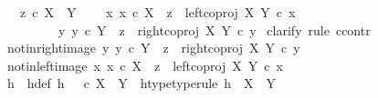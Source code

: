 \begin{isabellebody}
\ \ \ {\isachardoublequoteopen}z\ {\isasymin}\isactrlsub c\ X\ {\isasymCoprod}\ Y{\isachardoublequoteclose}\isanewline
\ \ \ {\isachardoublequoteopen}{\isacharparenleft}{\kern0pt}{\isasymexists}\ x{\isachardot}{\kern0pt}\ {\isacharparenleft}{\kern0pt}x\ {\isasymin}\isactrlsub c\ X\ {\isasymand}\ z\ {\isacharequal}{\kern0pt}\ {\isacharparenleft}{\kern0pt}left{\isacharunderscore}{\kern0pt}coproj\ X\ Y{\isacharparenright}{\kern0pt}\ {\isasymcirc}\isactrlsub c\ x{\isacharparenright}{\kern0pt}{\isacharparenright}{\kern0pt}\isanewline
\ \ \ \ \ \ {\isasymor}\ \ {\isacharparenleft}{\kern0pt}{\isasymexists}\ y{\isachardot}{\kern0pt}\ {\isacharparenleft}{\kern0pt}y\ {\isasymin}\isactrlsub c\ Y\ {\isasymand}\ z\ {\isacharequal}{\kern0pt}\ {\isacharparenleft}{\kern0pt}right{\isacharunderscore}{\kern0pt}coproj\ X\ Y{\isacharparenright}{\kern0pt}\ {\isasymcirc}\isactrlsub c\ y{\isacharparenright}{\kern0pt}{\isacharparenright}{\kern0pt}{\isachardoublequoteclose}\isanewline
%
\isadelimproof
%
\endisadelimproof
%
\isatagproof
{}\isamarkupfalse%
\ {\isacharparenleft}{\kern0pt}clarify{\isacharcomma}{\kern0pt}\ rule\ ccontr{\isacharparenright}{\kern0pt}\isanewline
\ \ \isamarkupfalse%
\ not{\isacharunderscore}{\kern0pt}in{\isacharunderscore}{\kern0pt}right{\isacharunderscore}{\kern0pt}image{\isacharcolon}{\kern0pt}\ {\isachardoublequoteopen}{\isasymnexists}y{\isachardot}{\kern0pt}\ y\ {\isasymin}\isactrlsub c\ Y\ {\isasymand}\ z\ {\isacharequal}{\kern0pt}\ right{\isacharunderscore}{\kern0pt}coproj\ X\ Y\ {\isasymcirc}\isactrlsub c\ y{\isachardoublequoteclose}\isanewline
\ \ \isamarkupfalse%
\ not{\isacharunderscore}{\kern0pt}in{\isacharunderscore}{\kern0pt}left{\isacharunderscore}{\kern0pt}image{\isacharcolon}{\kern0pt}\ {\isachardoublequoteopen}{\isasymnexists}x{\isachardot}{\kern0pt}\ x\ {\isasymin}\isactrlsub c\ X\ {\isasymand}\ z\ {\isacharequal}{\kern0pt}\ left{\isacharunderscore}{\kern0pt}coproj\ X\ Y\ {\isasymcirc}\isactrlsub c\ x{\isachardoublequoteclose}\isanewline
\ \ \isanewline
\ \ \isamarkupfalse%
\ h\ \ h{\isacharunderscore}{\kern0pt}def{\isacharcolon}{\kern0pt}\ {\isachardoublequoteopen}h\ {\isacharequal}{\kern0pt}\ {\isasymf}\ {\isasymcirc}\isactrlsub c\ {\isasymbeta}\isactrlbsub X\ {\isasymCoprod}\ Y\isactrlesub {\isachardoublequoteclose}\ \ h{\isacharunderscore}{\kern0pt}type{\isacharbrackleft}{\kern0pt}type{\isacharunderscore}{\kern0pt}rule{\isacharbrackright}{\kern0pt}{\isacharcolon}{\kern0pt}\ {\isachardoublequoteopen}h\ {\isacharcolon}{\kern0pt}\ X\ {\isasymCoprod}\ Y\ {\isasymrightarrow}\ {\isasymOmega}{\isachardoublequoteclose}\isanewline

\end{isabellebody}
